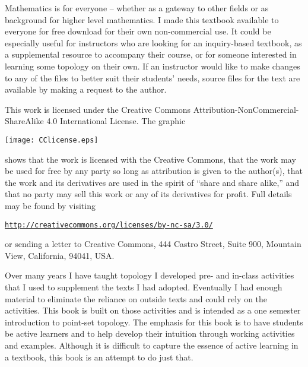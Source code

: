 \label{act:Preface}

 
Mathematics is for everyone -- whether as a gateway to other fields or as background for higher level mathematics.  I made this textbook available to everyone for free download for their own non-commercial use. It could be especially useful for instructors who are looking for an inquiry-based textbook, as a supplemental resource to accompany their course, or for someone interested in learning some topology on their own. If an instructor would like to make changes to any of the files to better suit their students' needs, source files for the text are available by making a request to the author.

This work is licensed under the Creative Commons Attribution-NonCommercial-ShareAlike 4.0 International License.  The graphic 
\begin{center}
\texttt{[image: CClicense.eps]}
\end{center}
shows that the work is licensed with the Creative Commons, that the work may be used for free by any party so long as attribution is given to the author(s), that the work and its derivatives are used in the spirit of ``share and share alike,'' and that no party may sell this work or any of its derivatives for profit.  Full details may be found by visiting
\begin{center}
\href{http://creativecommons.org/licenses/by-nc-sa/3.0/}{\texttt{http://creativecommons.org/licenses/by-nc-sa/3.0/}}
\end{center} 
or sending a letter to Creative Commons, 444 Castro Street, Suite 900, Mountain View, California, 94041, USA. 

Over many years I have taught topology I developed pre- and in-class activities that I used to supplement the texts I had adopted. Eventually I had enough material to eliminate the reliance on outside texts and could rely on the activities. This book is built on those activities and is intended as a one semester introduction to point-set topology. The emphasis for this book is to have students be active learners and to help develop their intuition through working activities and examples. Although it is difficult to capture the essence of active learning in a textbook, this book is an attempt to do just that.

